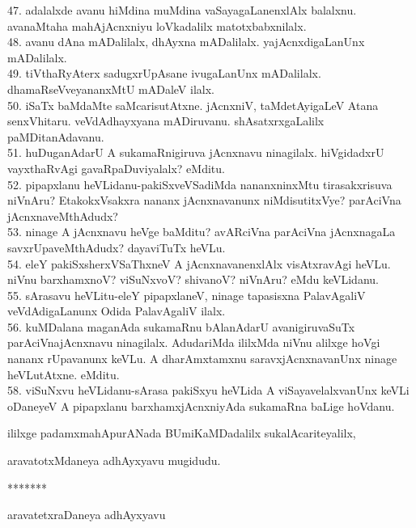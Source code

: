 \documentclass{article}
\begin{document}
47. adalalxde avanu hiMdina muMdina vaSayagaLanenxlAlx balalxnu. avanaMtaha mahAjAcnxniyu loVkadalilx matotxbabxnilalx.\\
48. avanu dAna mADalilalx, dhAyxna mADalilalx. yajAcnxdigaLanUnx mADalilalx.\\
49. tiVthaRyAterx sadugxrUpAsane ivugaLanUnx mADalilalx. dhamaRseVveyananxMtU mADaleV ilalx.\\
50. iSaTx baMdaMte saMcarisutAtxne. jAcnxniV, taMdetAyigaLeV Atana senxVhitaru. veVdAdhayxyana mADiruvanu. shAsatxrxgaLalilx paMDitanAdavanu.\\
51. huDuganAdarU A sukamaRnigiruva jAcnxnavu ninagilalx. hiVgidadxrU vayxthaRvAgi gavaRpaDuviyalalx? eMditu.\\
52. pipapxlanu heVLidanu-pakiSxveVSadiMda nananxninxMtu tirasakxrisuva niVnAru? EtakokxVsakxra nananx jAcnxnavanunx niMdisutitxVye? parAciVna jAcnxnaveMthAdudx?\\
53. ninage A jAcnxnavu heVge baMditu? avARciVna parAciVna jAcnxnagaLa savxrUpaveMthAdudx? dayaviTuTx heVLu.\\
54. eleY pakiSxsherxVSaThxneV A jAcnxnavanenxlAlx visAtxravAgi heVLu. niVnu barxhamxnoV? viSuNxvoV? shivanoV? niVnAru? eMdu keVLidanu.\\
55. sArasavu heVLitu-eleY pipapxlaneV, ninage tapasisxna PalavAgaliV veVdAdigaLanunx Odida PalavAgaliV ilalx.\\
56. kuMDalana maganAda sukamaRnu bAlanAdarU avanigiruvaSuTx parAciVnajAcnxnavu ninagilalx. AdudariMda ililxMda niVnu alilxge hoVgi nananx rUpavanunx keVLu. A dharAmxtamxnu saravxjAcnxnavanUnx ninage heVLutAtxne. eMditu.\\
58. viSuNxvu heVLidanu-sArasa pakiSxyu heVLida A viSayavelalxvanUnx keVLi oDaneyeV A pipapxlanu barxhamxjAcnxniyAda sukamaRna baLige hoVdanu.\\

\begin{center}
ililxge padamxmahApurANada BUmiKaMDadalilx sukalAcariteyalilx,
\end{center}

\begin{center}
aravatotxMdaneya adhAyxyavu mugidudu.
\end{center}

\begin{center}
*******
\end{center}

\begin{center}
aravatetxraDaneya adhAyxyavu
\end{center}
\end{document}
